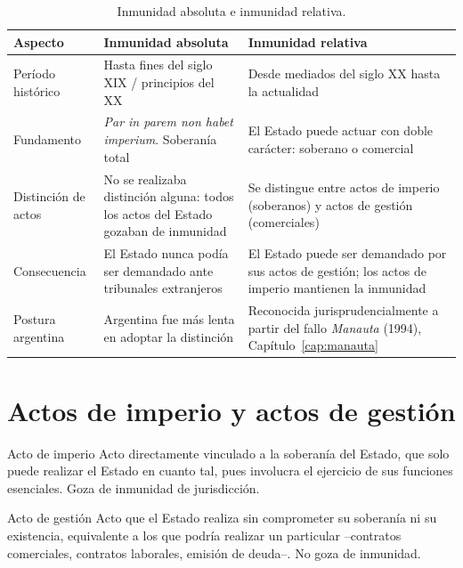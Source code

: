 \documentclass[12pt,oneside]{book}
\begin{document}
\begin{table}[H]
\centering
\renewcommand{\arraystretch}{1.3}
\begin{tabularx}{\textwidth}{>{\raggedright\arraybackslash}p{}>{\raggedright\arraybackslash}X>{\raggedright\arraybackslash}X}
\toprule
\textbf{Aspecto} & \textbf{Inmunidad absoluta} & \textbf{Inmunidad relativa} \\
\midrule
Período histórico & Hasta fines del siglo XIX / principios del XX & Desde mediados del siglo XX hasta la actualidad \\
Fundamento & \emph{Par in parem non habet imperium}. Soberanía total & El Estado puede actuar con doble carácter: soberano o comercial \\
Distinción de actos & No se realizaba distinción alguna: todos los actos del Estado gozaban de inmunidad & Se distingue entre actos de imperio (soberanos) y actos de gestión (comerciales) \\
Consecuencia & El Estado nunca podía ser demandado ante tribunales extranjeros & El Estado puede ser demandado por sus actos de gestión; los actos de imperio mantienen la inmunidad \\
Postura argentina & Argentina fue más lenta en adoptar la distinción & Reconocida jurisprudencialmente a partir del fallo \emph{Manauta} (1994), Capítulo~\ref{cap:manauta} \\
\bottomrule
\end{tabularx}
\caption{Inmunidad absoluta e inmunidad relativa.}
\end{table}

\section{Actos de imperio y actos de gestión}

\begin{definicion}{Acto de imperio}
Acto directamente vinculado a la soberanía del Estado, que solo puede realizar el Estado en cuanto tal, pues involucra el ejercicio de sus funciones esenciales. Goza de inmunidad de jurisdicción.
\end{definicion}

\begin{definicion}{Acto de gestión}
Acto que el Estado realiza sin comprometer su soberanía ni su existencia, equivalente a los que podría realizar un particular --contratos comerciales, contratos laborales, emisión de deuda--. No goza de inmunidad.
\end{definicion}
\end{document}
